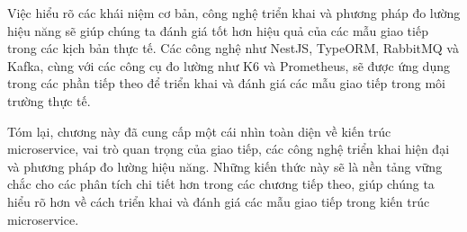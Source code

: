 Việc hiểu rõ các khái niệm cơ bản, công nghệ triển khai và phương pháp đo lường hiệu năng sẽ giúp chúng ta đánh giá tốt hơn hiệu quả của các mẫu giao tiếp trong các kịch bản thực tế. Các công nghệ như NestJS, TypeORM, RabbitMQ và Kafka, cùng với các công cụ đo lường như K6 và Prometheus, sẽ được ứng dụng trong các phần tiếp theo để triển khai và đánh giá các mẫu giao tiếp trong môi trường thực tế.

Tóm lại, chương này đã cung cấp một cái nhìn toàn diện về kiến trúc microservice, vai trò quan trọng của giao tiếp, các công nghệ triển khai hiện đại và phương pháp đo lường hiệu năng. Những kiến thức này sẽ là nền tảng vững chắc cho các phân tích chi tiết hơn trong các chương tiếp theo, giúp chúng ta hiểu rõ hơn về cách triển khai và đánh giá các mẫu giao tiếp trong kiến trúc microservice.